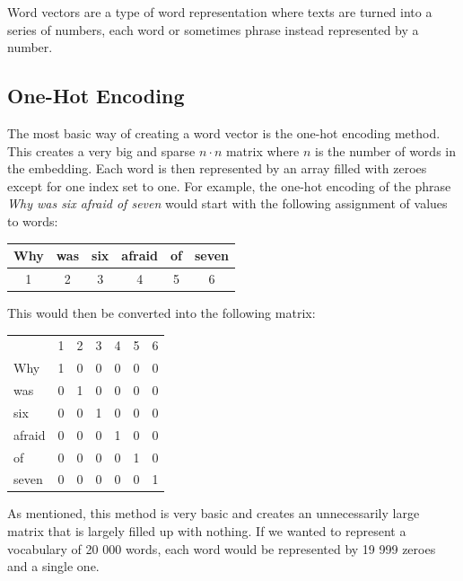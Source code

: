 \documentclass[nofilelist]{cslthse-msc}
\begin{document}
Word vectors are a type of word representation where texts are turned into a series of numbers, each word or sometimes phrase instead represented by a number.


\subsection{One-Hot Encoding}
The most basic way of creating a word vector is the one-hot encoding method. This creates a very big and sparse $n \cdot n$ matrix where $n$ is the number of words in the embedding. Each word is then represented by an array filled with zeroes except for one index set to one. For example, the one-hot encoding of the phrase \textit{Why was six afraid of seven} would start with the following assignment of values to words:

\begin{center}
    \begin{tabular}{c|c|c|c|c|c}
    
         Why & was & six & afraid & of & seven \\
         \hline
         1 & 2 & 3 & 4 & 5 & 6 \\
    \end{tabular}
\end{center}

This would then be converted into the following matrix:

\begin{center}
    \begin{tabular}{lllllll}
                            & 1 & 2 & 3 & 4 & 5 & 6 \\ \cline{2-7} 
\multicolumn{1}{l|}{Why}    & 1 & 0 & 0 & 0 & 0 & 0 \\
\multicolumn{1}{l|}{was}    & 0 & 1 & 0 & 0 & 0 & 0 \\
\multicolumn{1}{l|}{six}    & 0 & 0 & 1 & 0 & 0 & 0 \\
\multicolumn{1}{l|}{afraid} & 0 & 0 & 0 & 1 & 0 & 0 \\
\multicolumn{1}{l|}{of}     & 0 & 0 & 0 & 0 & 1 & 0 \\
\multicolumn{1}{l|}{seven}  & 0 & 0 & 0 & 0 & 0 & 1
    \end{tabular}
\end{center}

As mentioned, this method is very basic and creates an unnecessarily large matrix that is largely filled up with nothing. If we wanted to represent a vocabulary of 20 000 words, each word would be represented by 19 999 zeroes and a single one. 
\end{document}
